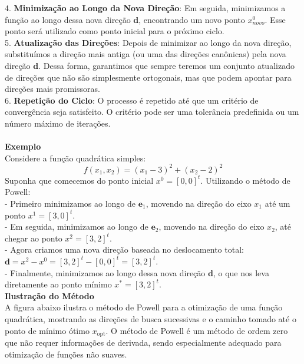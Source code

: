 \documentclass[a4paper, 12pt]{article}
\begin{document}
4. \textbf{Minimização ao Longo da Nova Direção}: Em seguida, minimizamos a função ao longo dessa nova direção \(\mathbf{d}\), encontrando um novo ponto \(x^{0}_{novo}\). Esse ponto será utilizado como ponto inicial para o próximo ciclo.\\

5. \textbf{Atualização das Direções}: Depois de minimizar ao longo da nova direção, substituímos a direção mais antiga (ou uma das direções canônicas) pela nova direção \(\mathbf{d}\). Dessa forma, garantimos que sempre teremos um conjunto atualizado de direções que não são simplesmente ortogonais, mas que podem apontar para direções mais promissoras.\\

6. \textbf{Repetição do Ciclo}: O processo é repetido até que um critério de convergência seja satisfeito. O critério pode ser uma tolerância predefinida ou um número máximo de iterações.\\\\

\textbf{Exemplo}\\

Considere a função quadrática simples:
\[
    f(x_1, x_2) = (x_1 - 3)^2 + (x_2 - 2)^2
\]
Suponha que comecemos do ponto inicial \(x^0 = [0, 0]^t\). Utilizando o método de Powell:\\

- Primeiro minimizamos ao longo de \(\mathbf{e}_1\), movendo na direção do eixo \(x_1\) até um ponto \(x^1 = [3, 0]^t\).\\
- Em seguida, minimizamos ao longo de \(\mathbf{e}_2\), movendo na direção do eixo \(x_2\), até chegar ao ponto \(x^2 = [3, 2]^t\).\\
- Agora criamos uma nova direção baseada no deslocamento total: \(\mathbf{d} = x^2 - x^0 = [3, 2]^t - [0, 0]^t = [3, 2]^t\).\\
- Finalmente, minimizamos ao longo dessa nova direção \(\mathbf{d}\), o que nos leva diretamente ao ponto mínimo \(x^* = [3, 2]^t\).\\

\textbf{Ilustração do Método}\\

A figura abaixo ilustra o método de Powell para a otimização de uma função quadrática, mostrando as direções de busca sucessivas e o caminho tomado até o ponto de mínimo ótimo $x_{\text{opt}}$. O método de Powell é um método de ordem zero que não requer informações de derivada, sendo especialmente adequado para otimização de funções não suaves.
\end{document}
